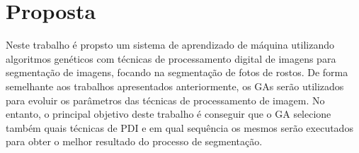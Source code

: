 \documentclass[12pt,oneside,a4paper,english,french,spanish,brazil,]{abntex2}
\begin{document}

\chapter{Proposta}

Neste trabalho é propsto um sistema de aprendizado de máquina utilizando algoritmos genéticos com técnicas de processamento digital de imagens para segmentação de imagens, focando na segmentação de fotos de rostos. De forma semelhante aos trabalhos apresentados anteriormente, os GAs serão utilizados para evoluir os parâmetros das técnicas de processamento de imagem. No entanto, o principal objetivo deste trabalho é conseguir que o GA selecione também quais técnicas de PDI e em qual sequência os mesmos serão executados para obter o melhor resultado do processo de segmentação.
\end{document}
